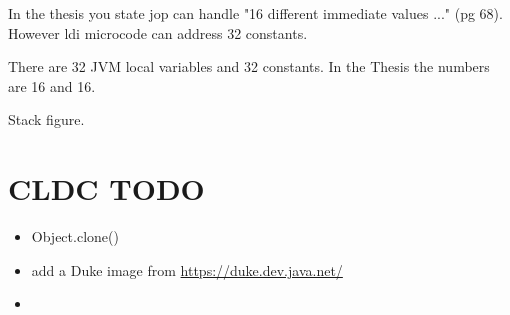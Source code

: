 \documentclass[a4paper,12pt]{scrartcl}
\begin{document}
In the thesis you state jop can handle "16 different immediate
values ..." (pg 68). However ldi microcode can address 32 constants.

There are 32 JVM local variables and 32 constants. In the Thesis the
numbers are 16 and 16.

Stack figure.

\section{CLDC TODO}

\begin{itemize}
    \item Object.clone()
    \item add a Duke image from \url{https://duke.dev.java.net/}
    \item
\end{itemize}
\end{document}

